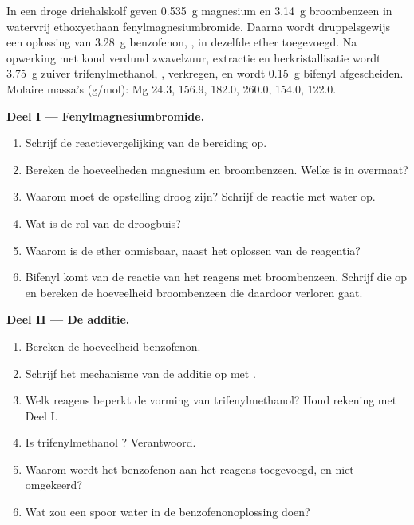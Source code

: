\begin{problem}
\label{pb:b1:organomagnesium:1}
In een droge driehalskolf geven \qty{0.535}{g} magnesium en
\qty{3.14}{g} broombenzeen in watervrij ethoxyethaan
fenylmagnesiumbromide. Daarna wordt druppelsgewijs een oplossing van
\qty{3.28}{g} benzofenon, , in dezelfde ether toegevoegd. Na
opwerking met koud verdund zwavelzuur, extractie en herkristallisatie
wordt \qty{3.75}{g} zuiver trifenylmethanol, , verkregen,
en wordt \qty{0.15}{g} bifenyl afgescheiden. Molaire massa's
(\unit{g/mol}): Mg 24.3,  156.9,  182.0,
 260.0,  154.0,  122.0.

\medskip
\noindent\textbf{Deel I --- Fenylmagnesiumbromide.}
\begin{enumerate}
  \item Schrijf de reactievergelijking van de bereiding op.
  \item Bereken de hoeveelheden magnesium en broombenzeen. Welke is in
        overmaat?
  \item Waarom moet de opstelling droog zijn? Schrijf de reactie met water
        op.
  \item Wat is de rol van de droogbuis?
  \item Waarom is de ether onmisbaar, naast het oplossen van de
        reagentia?
  \item Bifenyl komt van de reactie van het reagens met broombenzeen.
        Schrijf die op en bereken de hoeveelheid broombenzeen die daardoor
        verloren gaat.
\end{enumerate}

\medskip
\noindent\textbf{Deel II --- De additie.}
\begin{enumerate}[resume]
  \item Bereken de hoeveelheid benzofenon.
  \item Schrijf het mechanisme van de additie op met .
  \item Welk reagens beperkt de vorming van trifenylmethanol? Houd
        rekening met Deel I.
  \item Is trifenylmethanol ? Verantwoord.
  \item Waarom wordt het benzofenon aan het reagens toegevoegd, en niet
        omgekeerd?
  \item Wat zou een spoor water in de benzofenonoplossing doen?
\end{enumerate}


\end{problem}
